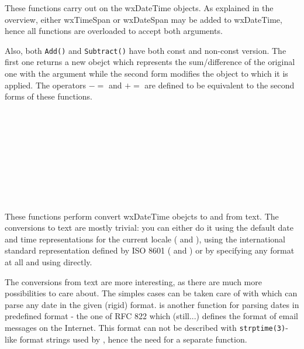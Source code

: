 
These functions carry out  on the wxDateTime
objects. As explained in the overview, either wxTimeSpan or wxDateSpan may be
added to wxDateTime, hence all functions are overloaded to accept both
arguments.

Also, both {\tt Add()} and {\tt Subtract()} have both const and non-const
version. The first one returns a new obejct which represents the
sum/difference of the original one with the argument while the second form
modifies the object to which it is applied. The operators $-=$ and $+=$ are
defined to be equivalent to the second forms of these functions.

\\
\\
\\
\\
\\
\\
\\
\\


These functions perform convert wxDateTime obejcts to and from text. The
conversions to text are mostly trivial: you can either do it using the default
date and time representations for the current locale (
 and 
), using the international standard
representation defined by ISO 8601 (
 and 
) or by specifying any format
at all and using  directly.

The conversions from text are more interesting, as there are much more
possibilities to care about. The simples cases can be taken care of with 
 which can parse any date in the
given (rigid) format.  is
another function for parsing dates in predefined format - the one of RFC 822
which (still...) defines the format of email messages on the Internet. This
format can not be described with {\tt strptime(3)}-like format strings used by 
, hence the need for a separate function.

